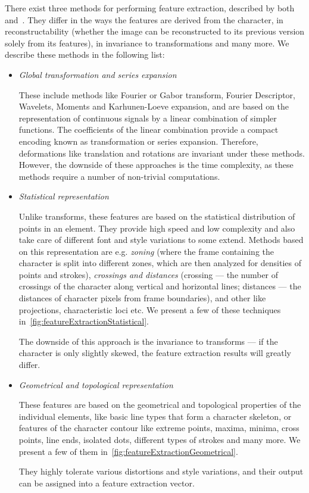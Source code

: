 There exist three methods for performing feature extraction, described by both~\citet{featureExtractionBook} and~\citet{featureExtractiontext}. They differ in the ways the features are derived from the character, in reconstructability (whether the image can be reconstructed to its previous version solely from its features), in invariance to transformations and many more. We describe these methods in the following list:

\begin{itemize}

\item \emph{Global transformation and series expansion}

These include methods like Fourier or Gabor transform, Fourier Descriptor, Wavelets, Moments and Karhunen-Loeve expansion, and are based on the representation of continuous signals by a linear combination of simpler functions. The coefficients of the linear combination provide a compact encoding known as transformation or series expansion. Therefore, deformations like translation and rotations are invariant under these methods. However, the downside of these approaches is the time complexity, as these methods require a number of non-trivial computations.

\item \emph{Statistical representation}

Unlike transforms, these features are based on the statistical distribution of points in an element. They provide high speed and low complexity and also take care of different font and style variations to some extend. Methods based on this representation are e.g. \emph{zoning} (where the frame containing the character is split into different zones, which are then analyzed for densities of points and strokes), \emph{crossings and distances} (crossing --- the number of crossings of the character along vertical and horizontal lines; distances --- the distances of character pixels from frame boundaries), and other like projections, characteristic loci etc. We present a few of these techniques in~\cref{fig:featureExtractionStatistical}.

The downside of this approach is the invariance to transforms --- if the character is only slightly skewed, the feature extraction results will greatly differ.

\item \emph{Geometrical and topological representation}

These features are based on the geometrical and topological properties of the individual elements, like basic line types that form a character skeleton, or features of the character contour like extreme points, maxima, minima, cross points, line ends, isolated dots, different types of strokes and many more. We present a few of them in~\cref{fig:featureExtractionGeometrical}.

They highly tolerate various distortions and style variations, and their output can be assigned into a feature extraction vector.

\end{itemize}

